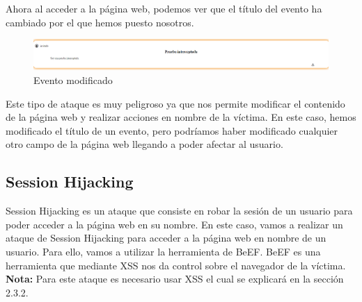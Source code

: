 \documentclass{report}
\begin{document}
                Ahora al acceder a la página web, podemos ver que el título del evento ha cambiado por el que hemos puesto nosotros.
                \begin{figure}[H]
                    \centering
                    \includegraphics[width=1\textwidth]{./img/vulnerabilidades/2.2/2.5.png}
                    \caption{Evento modificado}
                \end{figure}
                Este tipo de ataque es muy peligroso ya que nos permite modificar el contenido de la página web y realizar acciones en nombre de la víctima.
                En este caso, hemos modificado el título de un evento, pero podríamos haber modificado cualquier otro campo de la página web llegando a poder afectar al usuario.
                \clearpage
            \subsection{Session Hijacking}
                Session Hijacking es un ataque que consiste en robar la sesión de un usuario para poder acceder a la página web en su nombre.
                En este caso, vamos a realizar un ataque de Session Hijacking para acceder a la página web en nombre de un usuario.
                Para ello, vamos a utilizar la herramienta de BeEF.
                BeEF es una herramienta que mediante XSS nos da control sobre el navegador de la víctima.\\

                \textbf{Nota:} Para este ataque es necesario usar XSS el cual se explicará en la sección 2.3.2.\\
\end{document}
